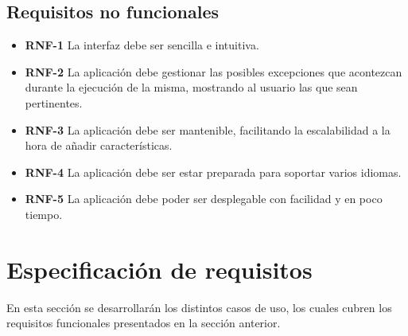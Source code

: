 \subsection{Requisitos no funcionales}

\begin{itemize}
	\item \textbf{RNF-1} La interfaz debe ser sencilla e intuitiva.
	\item \textbf{RNF-2} La aplicación debe gestionar las posibles excepciones que acontezcan durante la ejecución de la misma, mostrando al usuario las que sean pertinentes.
	\item \textbf{RNF-3} La aplicación debe ser mantenible, facilitando la escalabilidad a la hora de añadir características.
	\item \textbf{RNF-4} La aplicación debe ser estar preparada para soportar varios idiomas.
	\item \textbf{RNF-5} La aplicación debe poder ser desplegable con facilidad y en poco tiempo.
	
\end{itemize}

\section{Especificación de requisitos}

En esta sección se desarrollarán los distintos casos de uso, los cuales cubren los requisitos funcionales presentados en la sección anterior.


